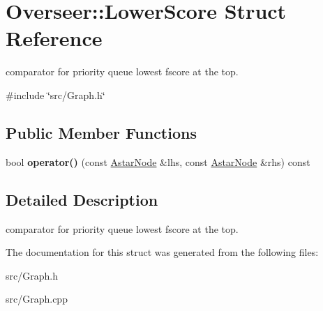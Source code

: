 \hypertarget{structOverseer_1_1LowerScore}{}\section{Overseer\+:\+:Lower\+Score Struct Reference}
\label{structOverseer_1_1LowerScore}


comparator for priority queue lowest fscore at the top.  




{\ttfamily \#include \char`\"{}src/\+Graph.\+h\char`\"{}}

\subsection*{Public Member Functions}
\begin{DoxyCompactItemize}
\item 
\mbox{\label{structOverseer_1_1LowerScore_ae84552debf804d9b8746990c7f87a2c5}} 
bool {\bfseries operator()} (const \hyperlink{structOverseer_1_1AstarNode}{Astar\+Node} \&lhs, const \hyperlink{structOverseer_1_1AstarNode}{Astar\+Node} \&rhs) const
\end{DoxyCompactItemize}


\subsection{Detailed Description}
comparator for priority queue lowest fscore at the top. 

The documentation for this struct was generated from the following files\+:\begin{DoxyCompactItemize}
\item 
src/Graph.\+h\item 
src/Graph.\+cpp\end{DoxyCompactItemize}

